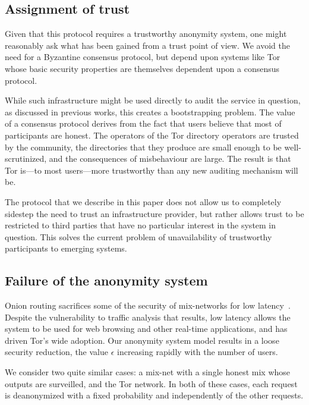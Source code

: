 \documentclass[USenglish]{llncs}
\begin{document}
\subsection{Assignment of trust}

Given that this protocol requires a trustworthy anonymity system, one might
reasonably ask what has been gained from a trust point of view.  We avoid the
need for a Byzantine consensus protocol, but depend upon systems like
Tor whose basic security properties are themselves dependent upon a consensus
protocol.

While such infrastructure might be used directly to audit the service in question,
as discussed in previous works, this creates a bootstrapping problem.  The value
of a consensus protocol derives from the fact that users believe that most
of participants are honest.  The operators of the Tor directory operators are
trusted by the community, the directories that they produce are small enough
to be well-scrutinized, and the consequences of misbehaviour are large.
The result is that Tor is---to most users---more trustworthy than any new
auditing mechanism will be.

The protocol that we describe in this paper
does not allow us to completely sidestep the need to trust
an infrastructure provider, but rather allows trust to be restricted to
third parties that have no particular interest in the system in question.
This solves the current problem of unavailability of trustworthy participants
to emerging systems.

\subsection{Failure of the anonymity system}

Onion routing sacrifices some of the security of mix-networks
for low latency~\cite{tor-design}.  Despite the vulnerability to traffic analysis that results,
low latency allows the system to be used for web browsing and other real-time applications,
and has driven Tor's wide adoption.  Our anonymity system model results in
a loose security reduction, the value $\epsilon$ increasing rapidly with
the number of users.

We consider two quite similar cases: a mix-net with a single honest mix whose outputs are
surveilled, and the Tor network.  In both of these cases, each request is deanonymized
with a fixed probability and independently of the other requests.
\end{document}
